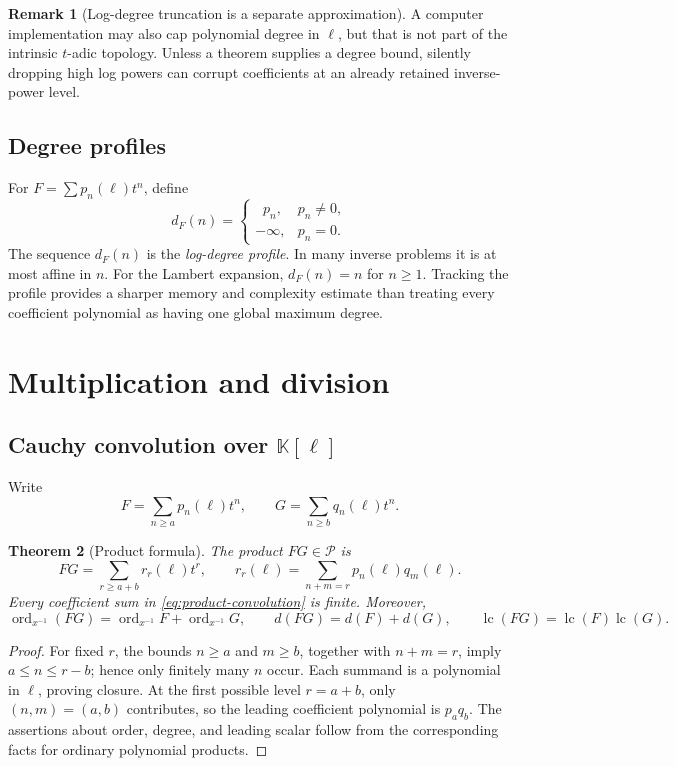 \documentclass[11pt,oneside]{article}
\numberwithin{equation}{section}
\newtheorem{theorem}{Theorem}[section]
\theoremstyle{definition}
\newtheorem{remark}[theorem]{Remark}
\newcommand{\K}{\mathbb K}
\newcommand{\PL}{\mathscr P}
\newcommand{\ordx}{\operatorname{ord}_{x^{-1}}}
\newcommand{\lc}{\operatorname{lc}}
\DeclareMathOperator{\degell}{deg_{\ell}}
\begin{document}
\begin{remark}[Log-degree truncation is a separate approximation]
A computer implementation may also cap polynomial degree in \(\ell\), but that
is not part of the intrinsic \(t\)-adic topology.  Unless a theorem supplies a
degree bound, silently dropping high log powers can corrupt coefficients at an
already retained inverse-power level.
\end{remark}

\subsection{Degree profiles}

For \(F=\sum p_n(\ell)t^n\), define
\[
  d_F(n)=\begin{cases}\degell p_n,&p_n\ne0,\\-\infty,&p_n=0.\end{cases}
\]
The sequence \(d_F(n)\) is the \emph{log-degree profile}.  In many inverse
problems it is at most affine in \(n\).  For the Lambert expansion,
\(d_F(n)=n\) for \(n\ge1\).  Tracking the profile provides a sharper memory and
complexity estimate than treating every coefficient polynomial as having one
global maximum degree.

\section{Multiplication and division}\label{sec:mul-div}

\subsection{Cauchy convolution over \(\K[\ell]\)}

Write
\[
  F=\sum_{n\ge a}p_n(\ell)t^n,
  \qquad G=\sum_{n\ge b}q_n(\ell)t^n.
\]

\begin{theorem}[Product formula]\label{thm:product}
The product \(FG\in\PL\) is
\begin{equation}\label{eq:product-convolution}
  FG=\sum_{r\ge a+b}r_r(\ell)t^r,
  \qquad
  r_r(\ell)=\sum_{n+m=r}p_n(\ell)q_m(\ell).
\end{equation}
Every coefficient sum in \eqref{eq:product-convolution} is finite.  Moreover,
\[
  \ordx(FG)=\ordx F+\ordx G,
  \qquad d(FG)=d(F)+d(G),
  \qquad \lc(FG)=\lc(F)\lc(G).
\]
\end{theorem}

\begin{proof}
For fixed \(r\), the bounds \(n\ge a\) and \(m\ge b\), together with
\(n+m=r\), imply \(a\le n\le r-b\); hence only finitely many \(n\) occur.
Each summand is a polynomial in \(\ell\), proving closure.  At the first possible
level \(r=a+b\), only \((n,m)=(a,b)\) contributes, so the leading coefficient
polynomial is \(p_aq_b\).  The assertions about order, degree, and leading
scalar follow from the corresponding facts for ordinary polynomial products.
\end{proof}
\end{document}
